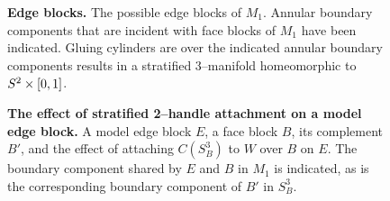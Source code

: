 \begin{figure}[h!]
	\caption{
		\textbf{Edge blocks.}
		The possible edge blocks of $M_1$.
		Annular boundary components that are incident with face blocks of $M_1$ have been indicated.
		Gluing cylinders are over the indicated annular boundary components results in a stratified 3--manifold homeomorphic to $S^2\times[0,1]$.
	}
	\label{fig:edge-block-incidence}
\end{figure}

\begin{figure}[h!]
	\caption{
		\textbf{The effect of stratified 2--handle attachment on a model edge block.}
		A model edge block $E$, a face block $B$, its complement $B'$, and the effect of attaching $C(S_B^3)$ to $W$ over $B$ on $E$.
		The boundary component shared by $E$ and $B$ in $M_1$ is indicated, as is the corresponding boundary component of $B'$ in $S_B^3$.
	}
	\label{fig:edge-face-shared-boundary}
\end{figure}


